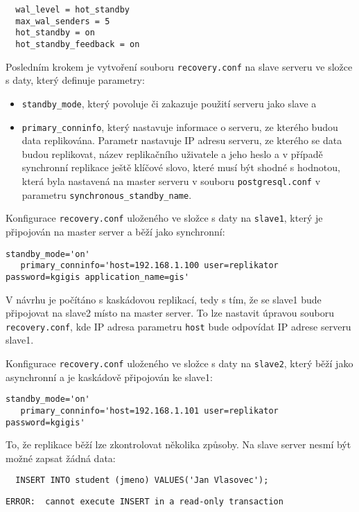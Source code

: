   \begin{lstlisting}
  wal_level = hot_standby
  max_wal_senders = 5
  hot_standby = on	
  hot_standby_feedback = on
  \end{lstlisting}

Posledním krokem je vytvoření souboru \texttt{recovery.conf} na slave serveru ve složce s daty, který definuje parametry:
\begin{itemize}
\item \texttt{standby\_mode}, který povoluje či zakazuje použití serveru jako slave a
\item \texttt{primary\_conninfo}, který nastavuje informace o serveru, ze kterého budou data replikována. Parametr nastavuje IP adresu serveru, ze kterého se data budou replikovat, název replikačního uživatele a jeho heslo a v případě synchronní replikace ještě klíčové slovo, které musí být shodné s hodnotou, která byla nastavená na master serveru v souboru \texttt{postgresql.conf} v parametru \texttt{synchronous\_standby\_name}.
\end{itemize}

Konfigurace \texttt{recovery.conf} uloženého ve složce s daty na \texttt{slave1}, který je připojován na master server a běží jako synchronní:

\begin{lstlisting}
standby_mode='on'
   primary_conninfo='host=192.168.1.100 user=replikator password=kgigis application_name=gis'  
\end{lstlisting}

V návrhu je počítáno s kaskádovou replikací, tedy s tím, že se slave1 bude připojovat na slave2 místo na master server. To lze nastavit úpravou souboru \texttt{recovery.conf}, kde IP adresa parametru \texttt{host} bude odpovídat IP adrese serveru slave1. 

Konfigurace \texttt{recovery.conf} uloženého ve složce s daty na \texttt{slave2}, který běží jako asynchronní a je kaskádově připojován ke slave1:

  \begin{lstlisting}
standby_mode='on'
   primary_conninfo='host=192.168.1.101 user=replikator password=kgigis'
  \end{lstlisting}

To, že replikace běží lze zkontrolovat několika způsoby. Na slave server nesmí být možné zapsat žádná data:

\begin{lstlisting}
  INSERT INTO student (jmeno) VALUES('Jan Vlasovec');
\end{lstlisting}
\begin{lstlisting}[keywordstyle=\color{black},identifierstyle=\color{black},stringstyle=\color{black}]
  ERROR:  cannot execute INSERT in a read-only transaction
\end{lstlisting}

